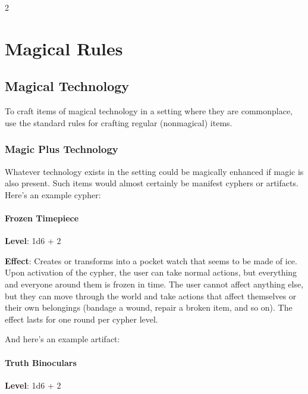 \begin{multicols}{2}

\chapter{Magical Rules}

\section{Magical Technology}

To craft items of magical technology in a setting where they are commonplace, use the standard rules for crafting regular (nonmagical) items.

\subsection{Magic Plus Technology}

Whatever technology exists in the setting could be magically enhanced if magic is also present. Such items would almost certainly be manifest cyphers or artifacts. Here’s an example cypher:

\subsubsection{Frozen Timepiece}

\textbf{Level}: 1d6 + 2

\textbf{Effect}: Creates or transforms into a pocket watch that seems to be made of ice. Upon activation of the cypher, the user can take normal actions, but everything and everyone around them is frozen in time. The user cannot affect anything else, but they can move through the world and take actions that affect themselves or their own belongings (bandage a wound, repair a broken item, and so on). The effect lasts for one round per cypher level.

And here’s an example artifact:

\subsubsection{Truth Binoculars}

\textbf{Level}: 1d6 + 2


\end{multicols}
